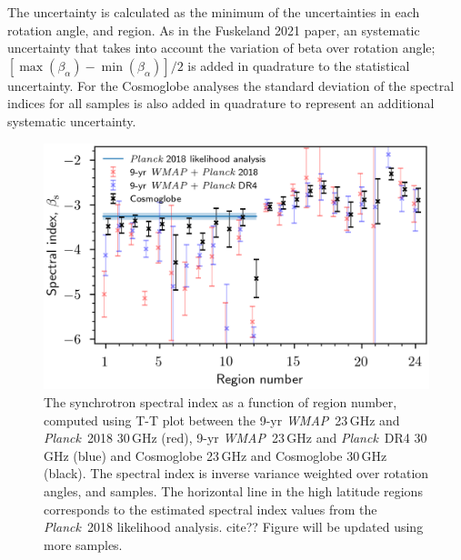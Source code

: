 \documentclass[twocolumn]{../../common/aa}
\def\WMAP{\emph{WMAP}}
\def\Planck{\emph{Planck}}
\newcommand{\red}[0]{\color{red}}
\begin{document}
The uncertainty is calculated as the minimum of the uncertainties in each rotation angle, and region. As in the Fuskeland 2021 paper, an systematic uncertainty that takes into account the variation of beta over rotation angle; $[ \max(\beta_\alpha) - \min(\beta_\alpha) ] /2$ is added in quadrature to the statistical uncertainty.
For the Cosmoglobe analyses the standard deviation of the spectral indices for all samples is also added in quadrature to represent an additional systematic uncertainty.

\begin{figure}
        \centering
        \includegraphics[width=\linewidth]{figures/cos30_region_beta_cosmoglobe_vs_wmap.png}
        \caption{The synchrotron spectral index as a function of region number, computed using T-T plot between the 9-yr \WMAP\ 23\,GHz and \Planck\ 2018 30\,GHz (red), 9-yr \WMAP\ 23\,GHz and \Planck\ DR4 30\,GHz (blue) and Cosmoglobe 23\,GHz and Cosmoglobe 30\,GHz (black). The spectral index is inverse variance weighted over rotation angles, and samples. The horizontal line in the high latitude regions corresponds to the estimated spectral index values from the \Planck\ 2018 likelihood analysis. cite?? {\red Figure will be updated using more samples.}}
        \label{fig:cos30_beta_region}
\end{figure}
\end{document}
